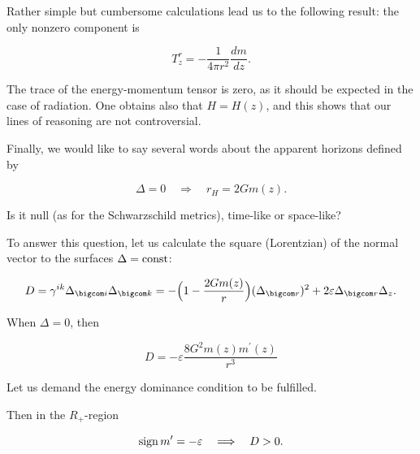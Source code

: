 Rather simple but cumbersome calculations lead us to the following result: the only nonzero component is

\begin{equation}

\label{trz}

T^r_z = - \frac{1}{4 \pi r^2} \frac{dm}{dz}.

\end{equation}

The trace of the energy-momentum tensor is zero, as it should be expected in the case of radiation. One obtains also that $H = H(z)$, and this shows that our lines of reasoning are not controversial.



Finally, we would like to say several words about the apparent horizons defined by 

$$\Delta = 0 \quad  \Longrightarrow \quad  r_H = 2 G m(z).$$ 

Is it null (as for the Schwarzschild metrics), time-like or space-like? 

To answer this question, let us calculate the square (Lorentzian) of the normal vector to the surfaces $\Delta = \rm const$:

\begin{equation}

\label{D}

D = \gamma^{ik}\Delta_{\bigcom i}\Delta_{\bigcom k} = - \Bigl(1 - \frac{2 G m(z)}{r}\Bigr)(\Delta_{\bigcom  r})^2 + 2 \varepsilon \Delta_{\bigcom r}\Delta_{z}.

\end{equation}

When $\Delta = 0$, then

\begin{equation}

\label{dap}

D = -  \varepsilon \frac{8 G^2 m (z) m^{\prime}(z)}{r^3}

\end{equation}

Let us demand the energy dominance condition to be fulfilled. 

Then in the $R_+$-region

\begin{equation}

\label{signum}

\mathop{\rm sign} m^{\prime} = - \varepsilon \quad  \Longrightarrow \quad   D > 0.

\end{equation}

